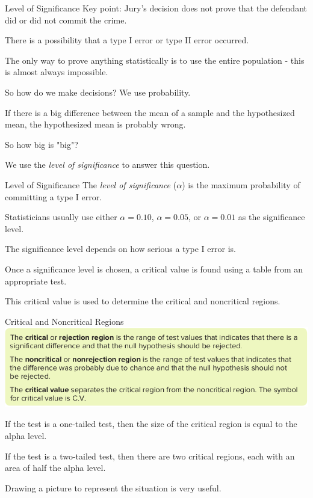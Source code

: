 \documentclass[t, aspectratio=169]{beamer}
\newcommand{\?}{\stackrel{?}{=}}
\begin{document}
	\begin{frame}{Level of Significance}
		Key point: Jury's decision does not prove that the defendant did or did not commit the crime. \pause
		
		There is a possibility that a type I error or type II error occurred. \pause
		
		The only way to prove anything statistically is to use the entire population - this is almost always impossible. \pause
		
		So how do we make decisions? \pause We use probability. \pause
		
		If there is a big difference between the mean of a sample and the hypothesized mean, the hypothesized mean is probably wrong. \pause
		
		So how big is "big"? \pause
		
		We use the \textit{level of significance} to answer this question.
	\end{frame}

	\begin{frame}{Level of Significance}
		The \textit{level of significance} ($\alpha$) is the maximum probability of committing a type I error. \pause
		
		Statisticians usually use either $\alpha = 0.10$, $\alpha = 0.05$, or $\alpha = 0.01$ as the significance level. \pause
		
		The significance level depends on how serious a type I error is. \pause
		
		Once a significance level is chosen, a critical value is found using a table from an appropriate test. \pause
		
		This critical value is used to determine the critical and noncritical regions.
	\end{frame}
	
	\begin{frame}{Critical and Noncritical Regions}
		\includegraphics[width=\textwidth]{regions.png} \pause
		
		If the test is a one-tailed test, then the size of the critical region is equal to the alpha level. \pause
		
		If the test is a two-tailed test, then there are two critical regions, each with an area of half the alpha level. \pause
		
		Drawing a picture to represent the situation is very useful.
	\end{frame}
\end{document}
